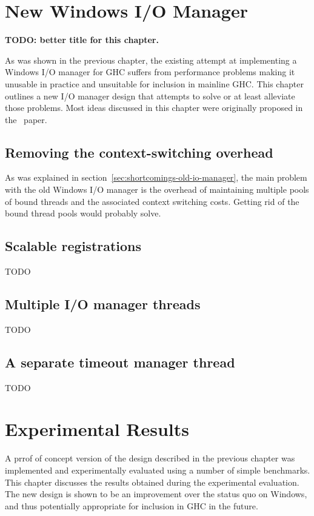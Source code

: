 \documentclass[a4paper,11pt,oneside]{report}
\begin{document}
\chapter{New Windows I/O Manager}
\label{chap:new-io-manager}

\textbf{TODO: better title for this chapter.}

As was shown in the previous chapter, the existing attempt at implementing a
Windows I/O manager for GHC suffers from performance problems making it unusable
in practice and unsuitable for inclusion in mainline GHC. This chapter outlines
a new I/O manager design that attempts to solve or at least alleviate those
problems. Most ideas discussed in this chapter were originally proposed in
the~\cite{bib:voellmy} paper.

\section{Removing the context-switching overhead}

As was explained in section~\ref{sec:shortcomings-old-io-manager}, the main
problem with the old Windows I/O manager is the overhead of maintaining multiple
pools of bound threads and the associated context switching costs. Getting rid
of the bound thread pools would probably solve.

\section{Scalable registrations}

TODO

\section{Multiple I/O manager threads}

TODO

\section{A separate timeout manager thread}

TODO

\chapter{Experimental Results}
\label{chap:evaluation}

A prrof of concept version of the design described in the previous chapter was
implemented and experimentally evaluated using a number of simple
benchmarks. This chapter discusses the results obtained during the experimental
evaluation. The new design is shown to be an improvement over the status quo on
Windows, and thus potentially appropriate for inclusion in GHC in the future.
\end{document}

